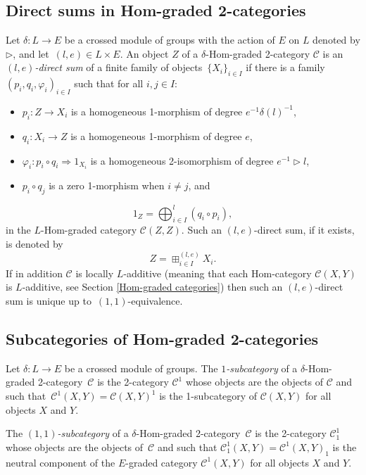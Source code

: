 \documentclass[a4paper, oneside]{amsart}
\numberwithin{equation}{subsection}
\theoremstyle{referencedlemma}
\theoremstyle{plain} %
\theoremstyle{remark}
\begin{document}
\subsection{Direct sums in Hom-graded 2-categories}\label{Direct sums}
Let $\delta \colon L\to E$ be a crossed module of groups with the action of $E$ on $L$ denoted by $\triangleright$, and let~$(l,e) \in L\times E$. An object $Z$ of a $\delta$-Hom-graded 2-category $\mathcal{C}$ is an~\emph{$(l,e)$-direct sum} of a finite family of objects~$\{X_i\}_{i\in I}$ if there is a family $(p_i, q_i, \varphi_i)_{i\in I}$ such that for all $i,j\in I$:
\begin{itemize}
\item  $p_i\colon Z\to X_i$ is a homogeneous 1-morphism of degree $e^{-1}\delta (l)^{-1}$,
\item $q_i\colon X_i\to Z$ is a homogeneous 1-morphism of degree $e$, 
\item $\varphi_i\colon p_i\circ q_i\Rightarrow 1_{X_i}$ is a homogeneous 2-isomorphism of degree $e^{-1}\triangleright l$,
\item $p_i\circ q_j$ is a zero 1-morphism when $i\neq j$, and
\end{itemize} 
$$
1_Z = \bigoplus_{i\in I}^{l}(q_i \circ p_i),
$$
in the $L$-Hom-graded category $\mathcal{C}(Z,Z)$. 
Such an $(l,e)$-direct sum, if it exists, is denoted by
\begin{equation*}
Z = \boxplus_{i\in I}^{(l,e)}X_i.
\end{equation*}
If in addition $\mathcal{C}$ is locally $L$-additive (meaning that each Hom-category $\mathcal{C}(X,Y)$ is $L$-additive, see Section \ref{Hom-graded categories}) then such an $(l,e)$-direct sum is unique up to~$(1,1)$-equivalence. 

\subsection{Subcategories of Hom-graded 2-categories}\label{Subsection_1 and (1,1)-subcategories}Let $\delta\colon L \to E$ be a crossed module of groups. The \emph{\mbox{$1$-sub}\-category} of a $\delta$-Hom-graded 2-category~$\mathcal{C}$ is the 2-category $\mathcal{C}^1$ whose objects are the objects of $\mathcal{C}$ and such that~\mbox{$\mathcal{C}^1(X,Y) = \mathcal{C}(X,Y)^1$} is the 1-subcategory of $\mathcal{C}(X,Y)$ for all objects $X$ and $Y$. 


The \emph{$(1,1)$-subcategory} of a $\delta$-Hom-graded 2-category~$\mathcal{C}$ is the 2-category $\mathcal{C}^1_1$ whose objects are the objects of~$\mathcal{C}$ and such that $\mathcal{C}^1_1(X,Y) = \mathcal{C}^1(X,Y)_1$ is the neutral component of the $E$-graded category $\mathcal{C}^1(X,Y)$ for all objects $X$ and $Y$. 
\end{document}
